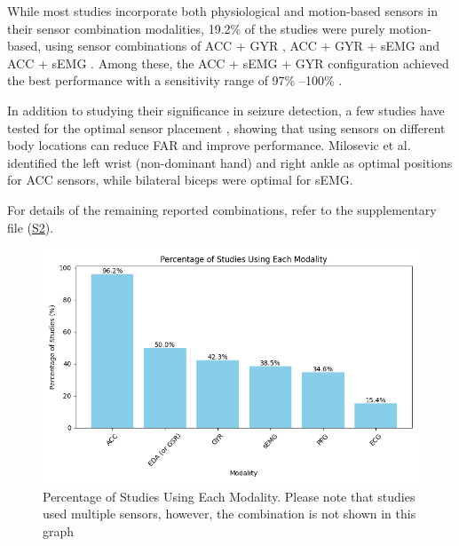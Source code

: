 While most studies incorporate both physiological and motion-based sensors in their sensor combination modalities, 19.2\% of the studies were purely motion-based, using sensor combinations of ACC + GYR \cite{Larsen2024-vn,Dong2022-oo}, ACC + GYR + sEMG \cite{Wang2025-my,Gheryani2017-yg} and ACC + sEMG \cite{Milosevic2016-ee}. Among these, the ACC + sEMG + GYR configuration achieved the best performance with a sensitivity range of 97\% \cite{Gheryani2017-yg}--100\% \cite{Wang2025-ql}.    

In addition to studying their significance in seizure detection, a few studies have tested for the optimal sensor placement \cite{Milosevic2016-ee,De_Cooman2018-pq}, showing that using sensors on different body locations can reduce FAR and improve performance. Milosevic et al. \cite{Milosevic2016-ee} identified the left wrist (non-dominant hand) and right ankle as optimal positions for ACC sensors, while bilateral biceps were optimal for sEMG.

For details of the remaining reported combinations, refer to the supplementary file (\href{https://docs.google.com/spreadsheets/d/1FjxwkHFbNDM84nuqg513gR_0vIVql-evoT1EMiqSYZU/edit?pli=1&gid=1893827577#gid=1893827577}{S2}).

\begin{figure}
    \centering
    \includegraphics[width=1\textwidth]{Results/figures/percentage_of_studies_using_each_modality.png}
    \caption{Percentage of Studies Using Each Modality. Please note that studies used multiple sensors, however, the combination is not shown in this graph}
    \label{fig:percentage_of_studies_using_each_modality}
\end{figure}

